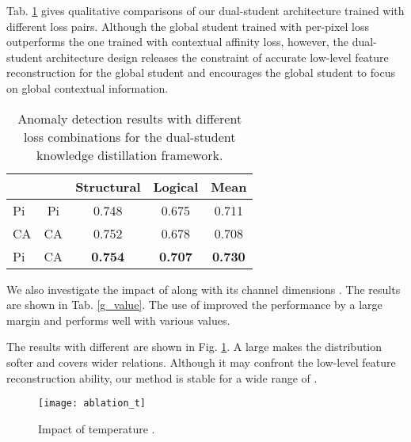 \documentclass[10pt,twocolumn,letterpaper]{article}
\begin{document}
Tab. \ref{loss_pair} gives qualitative comparisons of our dual-student architecture trained with different loss pairs. Although the global student trained with per-pixel loss outperforms the one trained with contextual affinity loss, however, the dual-student architecture design releases the constraint of accurate low-level feature reconstruction for the global student and encourages the global student to focus on global contextual information.
\begin{table}[t]
\caption{Anomaly detection results with different loss combinations for the dual-student knowledge distillation framework. }
\centering
\begin{tabular}{lcccc}
\hline
 &  & Structural & Logical & Mean           \\ \hline
Pi    & Pi    & 0.748              & 0.675           & 0.711          \\
CA    & CA    & 0.752              & 0.678           & 0.708          \\
Pi    & CA    & \textbf{0.754}     & \textbf{0.707}  & \textbf{0.730} \\ \hline
\end{tabular}

\label{loss_pair}
\end{table}


We also investigate the impact of  along with its channel dimensions . The results are shown in Tab. \ref{g_value}. The use of  improved the performance by a large margin and performs well with various  values.
\begin{table}[t]
\caption{Mean detection results with different  dimension values. "w/o" means  is not used and 
 for  channels, we do not use  layers to downsample and upsample the channel dimensions.}
\centering
{}

\label{g_value}
\end{table}

The results with different  are shown in Fig. \ref{fig_t}. A large  makes the distribution softer and covers wider relations. Although it may confront the low-level feature reconstruction ability, our method is stable for a wide range of .
\begin{figure}
  \centering
    \texttt{[image: ablation\_t]}
  \caption{Impact of temperature .}
    \label{fig_t}
\end{figure}
\end{document}
